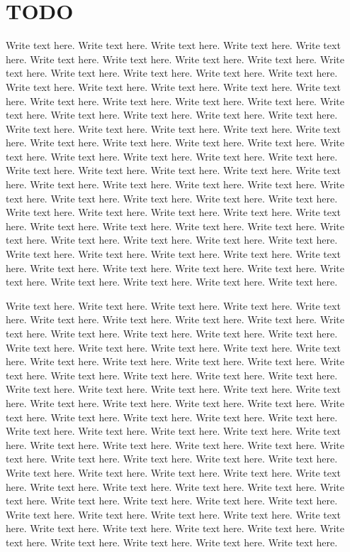 \documentclass{llncs}
\begin{document}
\section{TODO}
Write text here.  Write text here.  Write text here.  Write text here.
Write text here.  Write text here.  Write text here.  Write text here.
Write text here.  Write text here.  Write text here.  Write text here.
Write text here.  Write text here.  Write text here.  Write text here.
Write text here.  Write text here.  Write text here.  Write text here.
Write text here.  Write text here.  Write text here.  Write text here.
Write text here.  Write text here.  Write text here.  Write text here.
Write text here.  Write text here.  Write text here.  Write text here.
Write text here.  Write text here.  Write text here.  Write text here.
Write text here.  Write text here.  Write text here.  Write text here.
Write text here.  Write text here.  Write text here.  Write text here.
Write text here.  Write text here.  Write text here.  Write text here.
Write text here.  Write text here.  Write text here.  Write text here.
Write text here.  Write text here.  Write text here.  Write text here.
Write text here.  Write text here.  Write text here.  Write text here.
Write text here.  Write text here.  Write text here.  Write text here.
Write text here.  Write text here.  Write text here.  Write text here.
Write text here.  Write text here.  Write text here.  Write text here.
Write text here.  Write text here.  Write text here.  Write text here.
Write text here.  Write text here.  Write text here.  Write text here.
Write text here.  Write text here.  Write text here.  Write text here.

Write text here.  Write text here.  Write text here.  Write text here.
Write text here.  Write text here.  Write text here.  Write text here.
Write text here.  Write text here.  Write text here.  Write text here.
Write text here.  Write text here.  Write text here.  Write text here.
Write text here.  Write text here.  Write text here.  Write text here.
Write text here.  Write text here.  Write text here.  Write text here.
Write text here.  Write text here.  Write text here.  Write text here.
Write text here.  Write text here.  Write text here.  Write text here.
Write text here.  Write text here.  Write text here.  Write text here.
Write text here.  Write text here.  Write text here.  Write text here.
Write text here.  Write text here.  Write text here.  Write text here.
Write text here.  Write text here.  Write text here.  Write text here.
Write text here.  Write text here.  Write text here.  Write text here.
Write text here.  Write text here.  Write text here.  Write text here.
Write text here.  Write text here.  Write text here.  Write text here.
Write text here.  Write text here.  Write text here.  Write text here.
Write text here.  Write text here.  Write text here.  Write text here.
Write text here.  Write text here.  Write text here.  Write text here.
Write text here.  Write text here.  Write text here.  Write text here.
Write text here.  Write text here.  Write text here.  Write text here.
Write text here.  Write text here.  Write text here.  Write text here.
\end{document}
